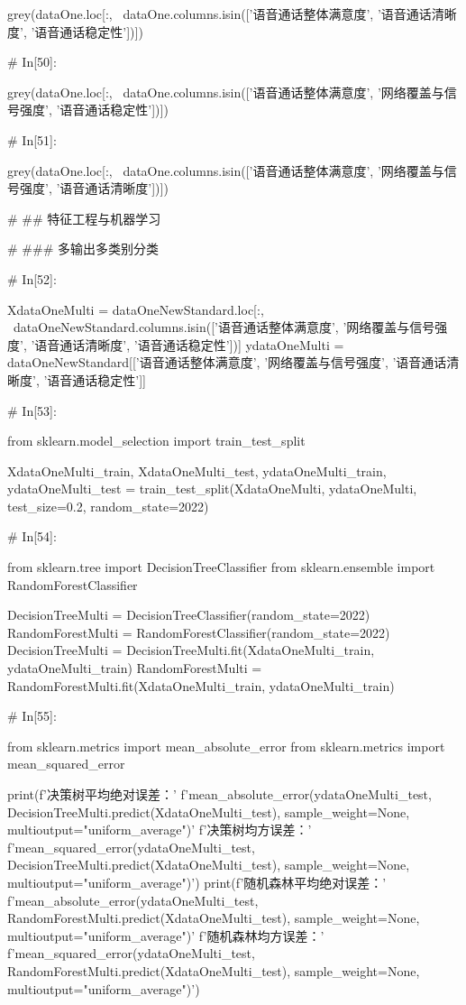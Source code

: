 \documentclass{MathorCupmodeling}
\begin{document}
\begin{python}
	
	grey(dataOne.loc[:, ~dataOne.columns.isin(['语音通话整体满意度', '语音通话清晰度', '语音通话稳定性'])])
	
	# In[50]:
	
	
	grey(dataOne.loc[:, ~dataOne.columns.isin(['语音通话整体满意度', '网络覆盖与信号强度', '语音通话稳定性'])])
	
	# In[51]:
	
	
	grey(dataOne.loc[:, ~dataOne.columns.isin(['语音通话整体满意度', '网络覆盖与信号强度', '语音通话清晰度'])])
	
	# ## 特征工程与机器学习
	
	# ### 多输出多类别分类
	
	# In[52]:
	
	
	XdataOneMulti = dataOneNewStandard.loc[:, ~dataOneNewStandard.columns.isin(['语音通话整体满意度', '网络覆盖与信号强度', '语音通话清晰度', '语音通话稳定性'])]
	ydataOneMulti = dataOneNewStandard[['语音通话整体满意度', '网络覆盖与信号强度', '语音通话清晰度', '语音通话稳定性']]
	
	# In[53]:
	
	
	from sklearn.model_selection import train_test_split
	
	XdataOneMulti_train, XdataOneMulti_test, ydataOneMulti_train, ydataOneMulti_test = train_test_split(XdataOneMulti, ydataOneMulti, test_size=0.2, random_state=2022)
	
	# In[54]:
	
	
	from sklearn.tree import DecisionTreeClassifier
	from sklearn.ensemble import RandomForestClassifier
	
	DecisionTreeMulti = DecisionTreeClassifier(random_state=2022)
	RandomForestMulti = RandomForestClassifier(random_state=2022)
	DecisionTreeMulti = DecisionTreeMulti.fit(XdataOneMulti_train, ydataOneMulti_train)
	RandomForestMulti = RandomForestMulti.fit(XdataOneMulti_train, ydataOneMulti_train)
	
	# In[55]:
	
	
	from sklearn.metrics import mean_absolute_error
	from sklearn.metrics import mean_squared_error
	
	print(f'决策树平均绝对误差：'
		  f'{mean_absolute_error(ydataOneMulti_test, DecisionTreeMulti.predict(XdataOneMulti_test), sample_weight=None, multioutput="uniform_average")}\n'
		  f'决策树均方误差：'
		  f'{mean_squared_error(ydataOneMulti_test, DecisionTreeMulti.predict(XdataOneMulti_test), sample_weight=None, multioutput="uniform_average")}')
	print(f'随机森林平均绝对误差：'
		  f'{mean_absolute_error(ydataOneMulti_test, RandomForestMulti.predict(XdataOneMulti_test), sample_weight=None, multioutput="uniform_average")}\n'
		  f'随机森林均方误差：'
		  f'{mean_squared_error(ydataOneMulti_test, RandomForestMulti.predict(XdataOneMulti_test), sample_weight=None, multioutput="uniform_average")}')
	

\end{python}
\end{document}
